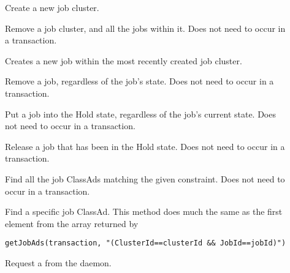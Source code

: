 \begin{description}
\item []
  Create a new job cluster.
\item []
  Remove a job cluster, and all the jobs within it.
  Does not need to occur in a transaction.
\item []
  Creates a new job within the most recently created job cluster.
\item []
  Remove a job, regardless of the job's state.
  Does not need to occur in a transaction.
\item []
  Put a job into the Hold state, regardless of the job's current state.
  Does not need to occur in a transaction.
\item []
  Release a job that has been in the Hold state.
  Does not need to occur in a transaction.

\item []
  Find all the job ClassAds matching the given constraint.
  Does not need to occur in a transaction.
\item []
   Find a specific job ClassAd. 
   This method does much the same as the first element from the array 
   returned by

\footnotesize
\begin{verbatim}
getJobAds(transaction, "(ClusterId==clusterId && JobId==jobId)")
\end{verbatim}
\normalsize


\item []
   Request a  from the  daemon.
\end{description}

